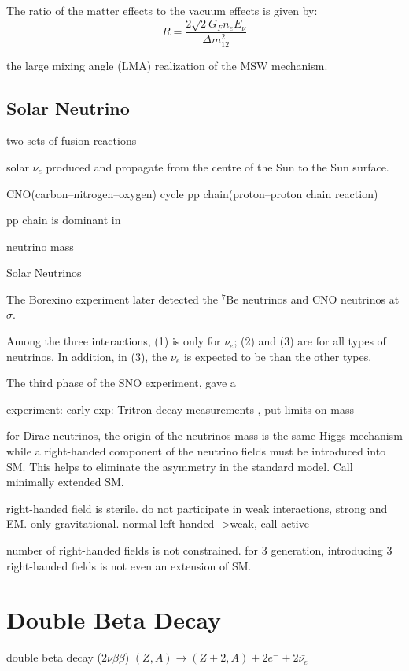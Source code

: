 \documentclass[preprint,12pt]{elsarticle}
\begin{document}
\cite{pdg2017}


The ratio of the matter effects to the vacuum effects is given by: 
\[
R=\frac{2\sqrt2 G_Fn_eE_\nu}{\Delta m_{12}^2}
\]


the large mixing angle (LMA) realization of the MSW mechanism.


\subsection{Solar Neutrino}

two sets of fusion reactions 

solar $\nu_e$ produced and propagate from the centre of the Sun to the Sun surface.  



CNO(carbon–nitrogen–oxygen) cycle
pp chain(proton–proton chain reaction)

pp chain is dominant in 

neutrino mass


Solar Neutrinos

The Borexino experiment later detected the $^7$Be neutrinos and CNO neutrinos at $\sigma$.


Among the three interactions, (1) is only for $\nu_e$; (2) and (3) are for all types of neutrinos. In addition, in (3), the $\nu_e$ is expected to be than the other types.  

The third phase of the SNO experiment,  gave a 



 experiment: early exp:   Tritron decay measurements , put limits on mass
 
 for Dirac neutrinos, the origin of the neutrinos mass is the same Higgs mechanism while a right-handed component of the neutrino fields must be introduced into SM. This helps to eliminate the asymmetry in the standard model.  Call minimally extended SM.
 
 right-handed field is sterile. do not participate in weak interactions, strong and EM. only gravitational.
 normal left-handed ->weak, call active
 
 number of right-handed fields is not constrained. for 3 generation, introducing 3 right-handed fields is not even an extension of SM.


\section{Double Beta Decay}


double beta decay ($2\nu\beta\beta$)
$(Z,A) \to (Z+2,A)+2e^{-}+2\bar{\nu_e}$
\end{document}
